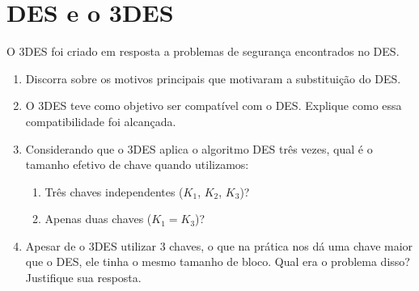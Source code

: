 \section{DES e o 3DES}

O 3DES foi criado em resposta a problemas de segurança encontrados no DES.
\begin{enumerate}
    \item Discorra sobre os motivos principais que motivaram a substituição do DES.
    \item O 3DES teve como objetivo ser compatível com o DES. Explique como essa compatibilidade foi alcançada.
    \item Considerando que o 3DES aplica o algoritmo DES três vezes, qual é o tamanho efetivo de chave quando utilizamos:
    \begin{enumerate}
        \item Três chaves independentes ($K_1$, $K_2$, $K_3$)?
        \item Apenas duas chaves ($K_1 = K_3$)?
    \end{enumerate}
    \item Apesar de o 3DES utilizar 3 chaves, o que na prática nos dá uma chave maior que o DES, ele tinha o mesmo tamanho de bloco. Qual era o problema disso?
    Justifique sua resposta.
\end{enumerate}

